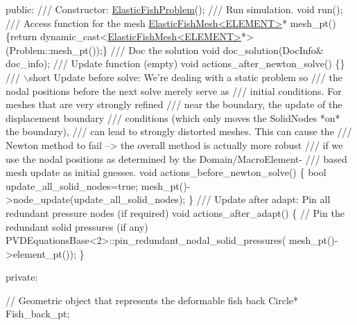 \begin{DoxyCodeInclude}
\textcolor{keyword}{public}:
\textcolor{comment}{}
\textcolor{comment}{ /// Constructor:}
\textcolor{comment}{} \hyperlink{classElasticFishProblem}{ElasticFishProblem}();
\textcolor{comment}{}
\textcolor{comment}{ /// Run simulation.}
\textcolor{comment}{} \textcolor{keywordtype}{void} run();
 \textcolor{comment}{}
\textcolor{comment}{ /// Access function for the mesh}
\textcolor{comment}{} \hyperlink{classElasticFishMesh}{ElasticFishMesh<ELEMENT>}* mesh\_pt() 
  \{\textcolor{keywordflow}{return} \textcolor{keyword}{dynamic\_cast<}\hyperlink{classElasticFishMesh}{ElasticFishMesh<ELEMENT>}*\textcolor{keyword}{>}(Problem::mesh\_pt());\} 
\textcolor{comment}{}
\textcolor{comment}{ /// Doc the solution}
\textcolor{comment}{} \textcolor{keywordtype}{void} doc\_solution(DocInfo& doc\_info);
\textcolor{comment}{}
\textcolor{comment}{ /// Update function (empty)}
\textcolor{comment}{} \textcolor{keywordtype}{void} actions\_after\_newton\_solve() \{\}
\textcolor{comment}{}
\textcolor{comment}{ /// \(\backslash\)short Update before solve: We're dealing with a static problem so}
\textcolor{comment}{ /// the nodal positions before the next solve merely serve as}
\textcolor{comment}{ /// initial conditions. For meshes that are very strongly refined}
\textcolor{comment}{ /// near the boundary, the update of the displacement boundary}
\textcolor{comment}{ /// conditions (which only moves the SolidNodes *on* the boundary),}
\textcolor{comment}{ /// can lead to strongly distorted meshes. This can cause the}
\textcolor{comment}{ /// Newton method to fail --> the overall method is actually more robust}
\textcolor{comment}{ /// if we use the nodal positions as determined by the Domain/MacroElement-}
\textcolor{comment}{ /// based mesh update as initial guesses. }
\textcolor{comment}{} \textcolor{keywordtype}{void} actions\_before\_newton\_solve()
  \{ 
   \textcolor{keywordtype}{bool} update\_all\_solid\_nodes=\textcolor{keyword}{true};
   mesh\_pt()->node\_update(update\_all\_solid\_nodes);
  \}   
\textcolor{comment}{}
\textcolor{comment}{ /// Update after adapt: Pin all redundant pressure nodes (if required)}
\textcolor{comment}{} \textcolor{keywordtype}{void} actions\_after\_adapt()
  \{ 
   \textcolor{comment}{// Pin the redundant solid pressures (if any)}
   PVDEquationsBase<2>::pin\_redundant\_nodal\_solid\_pressures(
    mesh\_pt()->element\_pt());
  \}


\textcolor{keyword}{private}:

 \textcolor{comment}{// Geometric object that represents the deformable fish back}
 Circle* Fish\_back\_pt;


\end{DoxyCodeInclude}
